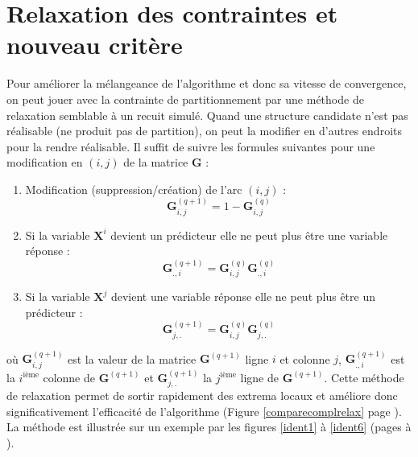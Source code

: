 \documentclass[12pt,a4paper]{report}
\begin{document}
	\section{Relaxation des contraintes et nouveau critère}
		Pour améliorer la mélangeance de l'algorithme et donc sa vitesse de convergence, on peut jouer avec la contrainte de partitionnement par une méthode de relaxation semblable à un recuit simulé. Quand une structure candidate n'est pas réalisable (ne produit pas de partition), on peut la modifier en d'autres endroits pour la rendre réalisable. Il suffit de suivre les formules suivantes pour une modification en $(i,j)$ de la  matrice $\boldsymbol{G}$ :
\begin{enumerate}
	\item Modification (suppression/création) de l'arc $(i,j)$ :
	\begin{equation}
		\boldsymbol{G}_{i,j}^{(q+1)}=1-\boldsymbol{G}_{i,j}^{(q)}  \nonumber 
	\end{equation}
	\item Si la variable $\boldsymbol{X}^i$ devient un prédicteur elle ne peut plus être une variable réponse :
	\begin{equation}
		\boldsymbol{G}_{.,i}^{(q+1)}= \boldsymbol{G}_{i,j}^{(q)}\boldsymbol{G}_{.,i}^{(q)}  \nonumber 
	\end{equation}
	\item Si la variable $\boldsymbol{X}^j$ devient une variable réponse elle ne peut plus être un prédicteur :
	\begin{equation}
		\boldsymbol{G}_{j,.}^{(q+1)}=\boldsymbol{G}_{i,j}^{(q)}\boldsymbol{G}_{j,.}^{(q)}  \nonumber 
	\end{equation}
\end{enumerate}
		où $\boldsymbol{G}_{i,j}^{(q+1)}$ est la valeur de la matrice $\boldsymbol{G}^{(q+1)}$ ligne $i$ et colonne $j$, $\boldsymbol{G}_{.,i}^{(q+1)}$ est la $i^{\textrm{ième}}$ colonne de $\boldsymbol{G}^{(q+1)}$ et $\boldsymbol{G}_{j,.}^{(q+1)}$ la $j^{\textrm{ième}}$ ligne de $\boldsymbol{G}^{(q+1)}$.
		Cette méthode de relaxation permet de sortir rapidement des extrema locaux et améliore donc significativement l'efficacité de l'algorithme (Figure \ref{comparecomplrelax} page \pageref{comparecomplrelax}). La méthode est illustrée sur un exemple par les figures \ref{ident1} à \ref{ident6} (pages \pageref{ident1} à \pageref{ident6}).\\
		 
\end{document}
